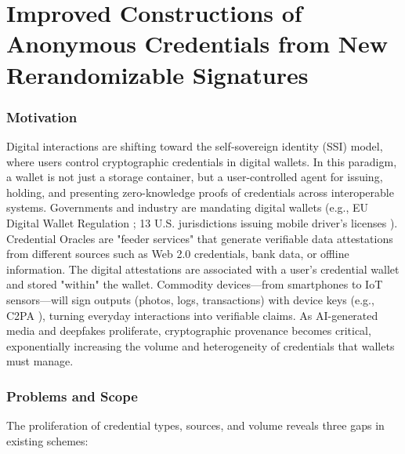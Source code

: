 \chapter{Improved Constructions of Anonymous Credentials from New Rerandomizable Signatures}\label{chap2}


\subsection{Motivation}

Digital interactions are shifting toward the self‑sovereign identity (SSI) model, where users control cryptographic credentials in digital wallets. In this paradigm, a wallet is not just a storage container, but a user-controlled agent for issuing, holding, and presenting zero-knowledge proofs of credentials across interoperable systems. Governments and industry are mandating digital wallets (e.g., EU Digital Wallet Regulation \cite{noauthor_regulation_2024}; 13 U.S. jurisdictions issuing mobile driver’s licenses \cite{aamva_jurisdiction_nodate}). Credential Oracles \cite{zhang_deco_2020, celi_distefano_2025} are "feeder services" that generate verifiable data attestations from different sources such as Web 2.0 credentials, bank data, or offline information.  The digital attestations are associated with a user's credential wallet and stored "within" the wallet. Commodity devices—from smartphones to IoT sensors—will sign outputs (photos, logs, transactions) with device keys (e.g., C2PA \cite{c2paorg_content_2024}), turning everyday interactions into verifiable claims. As AI-generated media and deepfakes proliferate, cryptographic provenance becomes critical, exponentially increasing the volume and heterogeneity of credentials that wallets must manage.



\subsection{Problems and Scope}

The proliferation of credential types, sources, and volume reveals three gaps in existing schemes:

